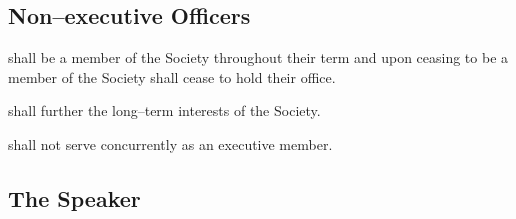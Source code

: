 \subsection {Non--executive Officers} 
\begin{longenum}[ label*=\thesubsection.\arabic*., align=left]
	\item shall be a member of the Society throughout their term and upon ceasing to be a member of the Society shall cease to hold their office.
	\item shall further the long--term interests of the Society.
    \item shall not serve concurrently as an executive member.
\end{longenum}
\subsection {The Speaker}
